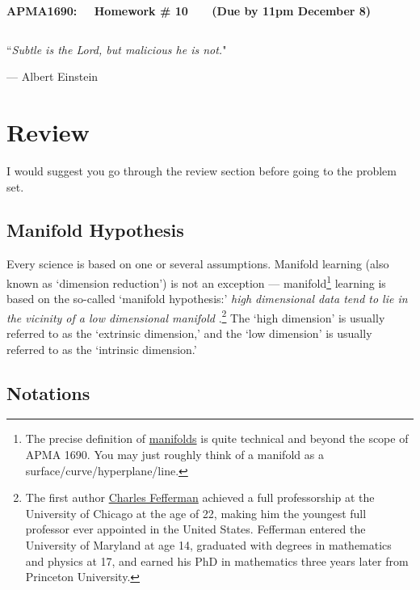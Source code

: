 \documentclass[11pt,letterpaper, leqno]{article}
\numberwithin{equation}{section}
\numberwithin{theorem}{section}
\numberwithin{lemma}{section}
\numberwithin{corollary}{section}
\numberwithin{definition}{section}
\numberwithin{proposition}{section}
\numberwithin{remark}{section}
\numberwithin{example}{section}
\begin{document}
\begin{center}
{\bf \Large APMA1690: ~~Homework \# 10 ~~~(Due by 11pm December 8)}
\end{center}
\[\]
\medskip


\begin{center}
    ``\textit{Subtle is the Lord, but malicious he is not.}"
\end{center}
\begin{flushright}
--- Albert Einstein
\end{flushright}


\section{Review}

I would suggest you go through the review section before going to the problem set.

\subsection{Manifold Hypothesis}\label{section: Manifold Hypothesis}

Every science is based on one or several assumptions. Manifold learning (also known as `dimension reduction') is not an exception --- manifold\footnote{The precise definition of \href{https://en.wikipedia.org/wiki/Manifold}{manifolds} is quite technical and beyond the scope of APMA 1690. You may just roughly think of a manifold as a surface/curve/hyperplane/line.} learning is based on the so-called `manifold hypothesis:' \textit{high dimensional data tend to lie in the vicinity of a low dimensional manifold} \citep{fefferman2016testing}.\footnote{The first author \href{https://en.wikipedia.org/wiki/Charles_Fefferman}{Charles Fefferman} achieved a full professorship at the University of Chicago at the age of 22, making him the youngest full professor ever appointed in the United States. Fefferman entered the University of Maryland at age 14, graduated with degrees in mathematics and physics at 17, and earned his PhD in mathematics three years later from Princeton University.} The `high dimension' is usually referred to as the `extrinsic dimension,' and the `low dimension' is usually referred to as the `intrinsic dimension.' 

\subsection{Notations}
\end{document}
